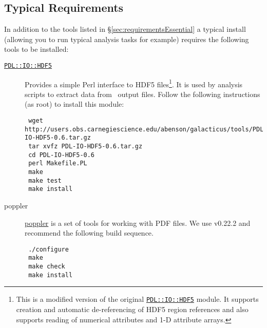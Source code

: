 \subsection{Typical Requirements}\label{sec:requirementsTypical}

In addition to the tools listed in \S\ref{sec:requirementsEssential} a typical install (allowing you to run typical analysis tasks for example) requires the following tools to be installed:

\begin{description}
\item [\href{http://users.obs.carnegiescience.edu/abenson/galacticus/tools/PDL-IO-HDF5-0.6.tar.gz}{{\tt PDL::IO::HDF5}}] Provides a simple Perl interface to HDF5 files\footnote{This is a modified version of the  original \protect\href{http://search.cpan.org/~cerney/PDL-IO-HDF5-0.63/}{{\tt PDL::IO::HDF5}} module. It supports creation and automatic de-referencing of HDF5 region references and also supports reading of numerical attributes and 1-D attribute arrays.}. It is used by analysis scripts to extract data from \glc\ output files. Follow the following instructions (as root) to install this module:
\begin{verbatim}
 wget http://users.obs.carnegiescience.edu/abenson/galacticus/tools/PDL-IO-HDF5-0.6.tar.gz
 tar xvfz PDL-IO-HDF5-0.6.tar.gz
 cd PDL-IO-HDF5-0.6
 perl Makefile.PL
 make
 make test
 make install
\end{verbatim}

\item [poppler] \href{http://poppler.freedesktop.org/}{poppler} is a set of tools for working with PDF files. We use v0.22.2 and recommend the following build sequence. 
\begin{verbatim}
 ./configure
 make
 make check
 make install
\end{verbatim}


\end{description}
